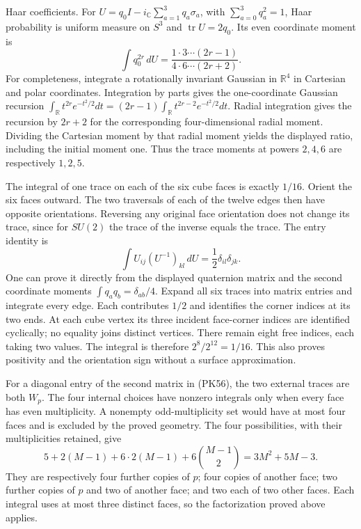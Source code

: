 \documentclass[11pt]{article}
\begin{document}
Haar coefficients.
For \(U=q_0I-i_{\mathbb C}\sum_{a=1}^3q_a\sigma_a\), with
\(\sum_{a=0}^3q_a^2=1\), Haar probability is uniform measure on \(S^3\) and
\(\operatorname{tr}U=2q_0\). Its even coordinate moment is
\[
 \int q_0^{2r}\,dU
 =\frac{1\cdot3\cdots(2r-1)}{4\cdot6\cdots(2r+2)}.
\]
For completeness, integrate a rotationally invariant Gaussian in
\(\mathbb R^4\) in Cartesian and polar coordinates. Integration by parts
gives the one-coordinate Gaussian recursion
\(\int_{\mathbb R}t^{2r}e^{-t^2/2}dt
=(2r-1)\int_{\mathbb R}t^{2r-2}e^{-t^2/2}dt\).
Radial integration gives the recursion by \(2r+2\) for the corresponding
four-dimensional radial moment. Dividing the Cartesian moment by that radial
moment yields the displayed ratio, including the initial moment one.
Thus the trace moments at powers \(2,4,6\) are respectively \(1,2,5\).

The integral of one trace on each of the six cube faces is exactly \(1/16\).
Orient the six faces outward. The two traversals of each of the twelve
edges then have opposite orientations. Reversing any original face
orientation does not change its trace, since for \(SU(2)\) the trace of
the inverse equals the trace. The entry identity is
\[
 \int U_{ij}(U^{-1})_{kl}\,dU
       =\frac12\delta_{il}\delta_{jk}.
\]
One can prove it directly from the displayed quaternion matrix and the
second coordinate moments \(\int q_aq_b=\delta_{ab}/4\).
Expand all six traces into matrix entries and integrate every edge.
Each contributes \(1/2\) and identifies the corner indices at its two
ends. At each cube vertex its three incident face-corner indices are
identified cyclically; no equality joins distinct vertices. There remain
eight free indices, each taking two values. The integral is therefore
\(2^8/2^{12}=1/16\). This also proves positivity and the orientation sign
without a surface approximation.

For a diagonal entry of the second matrix in (PK56), the two external
traces are both \(W_p\). The four internal choices have nonzero integrals
only when every face has even multiplicity. A nonempty odd-multiplicity
set would have at most four faces and is excluded by the proved geometry.
The four possibilities, with their multiplicities retained, give
\[
 5+2(M-1)+6\cdot2(M-1)+6\binom{M-1}{2}
       =3M^2+5M-3.
\]
They are respectively four further copies of \(p\); four copies of another
face; two further copies of \(p\) and two of another face; and two each
of two other faces. Each integral uses at most three distinct faces, so
the factorization proved above applies.
\end{document}
